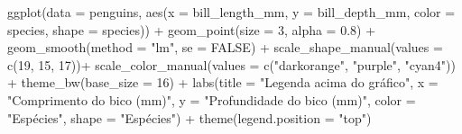 \documentclass[
]{book}
\newenvironment{Shaded}{\begin{snugshade}}{\end{snugshade}}
\newcommand{\AttributeTok}[1]{\textcolor[rgb]{0.61,0.61,0.61}{#1}}
\newcommand{\ConstantTok}[1]{\textcolor[rgb]{0,0,0}{#1}}
\newcommand{\DecValTok}[1]{\textcolor[rgb]{0.06,0.06,0.06}{#1}}
\newcommand{\FloatTok}[1]{\textcolor[rgb]{0.06,0.06,0.06}{#1}}
\newcommand{\FunctionTok}[1]{\textcolor[rgb]{0,0,0}{#1}}
\newcommand{\NormalTok}[1]{#1}
\newcommand{\SpecialCharTok}[1]{\textcolor[rgb]{0,0,0}{#1}}
\newcommand{\StringTok}[1]{\textcolor[rgb]{0.5,0.5,0.5}{#1}}
\begin{document}
\begin{Shaded}
\begin{Highlighting}[]

\FunctionTok{ggplot}\NormalTok{(}\AttributeTok{data =}\NormalTok{ penguins, }
       \FunctionTok{aes}\NormalTok{(}\AttributeTok{x =}\NormalTok{ bill\_length\_mm, }
           \AttributeTok{y =}\NormalTok{ bill\_depth\_mm,}
           \AttributeTok{color =}\NormalTok{ species,}
           \AttributeTok{shape =}\NormalTok{ species)) }\SpecialCharTok{+}
  \FunctionTok{geom\_point}\NormalTok{(}\AttributeTok{size =} \DecValTok{3}\NormalTok{, }
             \AttributeTok{alpha =} \FloatTok{0.8}\NormalTok{) }\SpecialCharTok{+}
  \FunctionTok{geom\_smooth}\NormalTok{(}\AttributeTok{method =} \StringTok{"lm"}\NormalTok{, }\AttributeTok{se =} \ConstantTok{FALSE}\NormalTok{) }\SpecialCharTok{+}
  \FunctionTok{scale\_shape\_manual}\NormalTok{(}\AttributeTok{values =} \FunctionTok{c}\NormalTok{(}\DecValTok{19}\NormalTok{, }\DecValTok{15}\NormalTok{, }\DecValTok{17}\NormalTok{))}\SpecialCharTok{+}
  \FunctionTok{scale\_color\_manual}\NormalTok{(}\AttributeTok{values =} \FunctionTok{c}\NormalTok{(}\StringTok{"darkorange"}\NormalTok{, }\StringTok{"purple"}\NormalTok{, }\StringTok{"cyan4"}\NormalTok{)) }\SpecialCharTok{+}
  \FunctionTok{theme\_bw}\NormalTok{(}\AttributeTok{base\_size =} \DecValTok{16}\NormalTok{) }\SpecialCharTok{+}
  \FunctionTok{labs}\NormalTok{(}\AttributeTok{title =} \StringTok{"Legenda acima do gráfico"}\NormalTok{, }\AttributeTok{x =} \StringTok{"Comprimento do bico (mm)"}\NormalTok{, }\AttributeTok{y =} \StringTok{"Profundidade do bico (mm)"}\NormalTok{, }
       \AttributeTok{color =} \StringTok{"Espécies"}\NormalTok{, }\AttributeTok{shape =} \StringTok{"Espécies"}\NormalTok{) }\SpecialCharTok{+}
  \FunctionTok{theme}\NormalTok{(}\AttributeTok{legend.position =} \StringTok{"top"}\NormalTok{)}


\end{Highlighting}
\end{Shaded}
\end{document}
